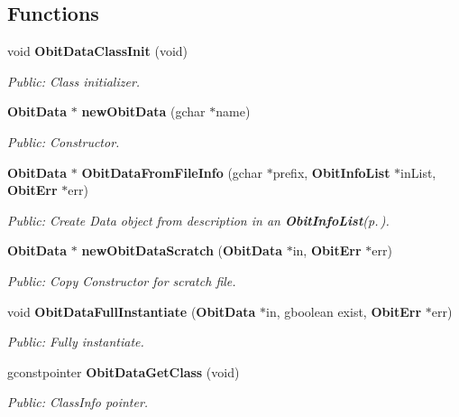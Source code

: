 \subsection*{Functions}
\begin{CompactItemize}
\item 
void {\bf Obit\-Data\-Class\-Init} (void)
\begin{CompactList}\small\item\em Public: Class initializer. \item\end{CompactList}\item 
{\bf Obit\-Data} $\ast$ {\bf new\-Obit\-Data} (gchar $\ast$name)
\begin{CompactList}\small\item\em Public: Constructor. \item\end{CompactList}\item 
{\bf Obit\-Data} $\ast$ {\bf Obit\-Data\-From\-File\-Info} (gchar $\ast$prefix, {\bf Obit\-Info\-List} $\ast$in\-List, {\bf Obit\-Err} $\ast$err)
\begin{CompactList}\small\item\em Public: Create Data object from description in an {\bf Obit\-Info\-List}{\rm (p.\,\pageref{structObitInfoList})}. \item\end{CompactList}\item 
{\bf Obit\-Data} $\ast$ {\bf new\-Obit\-Data\-Scratch} ({\bf Obit\-Data} $\ast$in, {\bf Obit\-Err} $\ast$err)
\begin{CompactList}\small\item\em Public: Copy Constructor for scratch file. \item\end{CompactList}\item 
void {\bf Obit\-Data\-Full\-Instantiate} ({\bf Obit\-Data} $\ast$in, gboolean exist, {\bf Obit\-Err} $\ast$err)
\begin{CompactList}\small\item\em Public: Fully instantiate. \item\end{CompactList}\item 
gconstpointer {\bf Obit\-Data\-Get\-Class} (void)
\begin{CompactList}\small\item\em Public: Class\-Info pointer. \item\end{CompactList}\item 

\end{CompactItemize}
